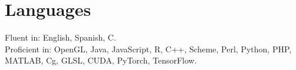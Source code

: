 \section{Languages}
Fluent in: English, Spanish, C.\\
Proficient in: OpenGL, Java, JavaScript, R, C++, Scheme, Perl, Python, PHP,\\
\mbox{MATLAB}, Cg, GLSL, CUDA, PyTorch, TensorFlow.

